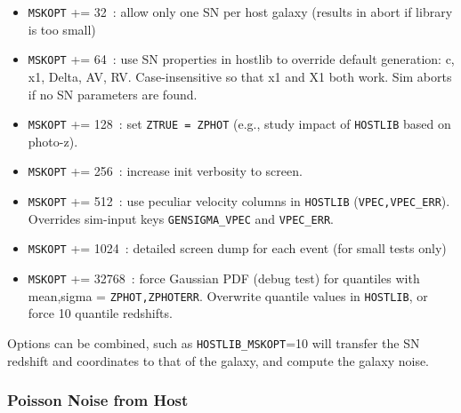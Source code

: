 \documentclass[12pt]{article}
\newcommand{\zhelio}{z_{\rm hel}}
\newcommand{\zcmb}{z_{\rm cmb}}
\newcommand{\vpec}{{\rm v}_{\rm pec}}
\newcommand{\ztrue}{{\tt ZTRUE}}
\begin{document}
{\begin{itemize}
      $\zhelio=$~\ztrue;  $\zcmb$ and $\mu$ are updated
      to account for new $\zhelio$ and generated $\vpec$.
%
\item {\tt MSKOPT} += 32~: allow only one SN per host galaxy 
                         (results in abort if library is too small)
%
\item {\tt MSKOPT} += 64~: 
  use SN properties in hostlib to override default generation:
  c, x1, Delta, AV, RV.
  Case-insensitive so that x1 and X1 both work.
  Sim aborts if no SN parameters are found.
%
\item {\tt MSKOPT} += 128~: set {\tt ZTRUE = ZPHOT} 
     (e.g., study impact of {\tt HOSTLIB} based on photo-z).
%
\item {\tt MSKOPT} += 256~: increase init verbosity to screen.
%
\item {\tt MSKOPT} += 512~: use peculiar velocity columns in {\tt HOSTLIB}
       ({\tt VPEC,VPEC\_ERR}). \\
       Overrides sim-input keys {\tt GENSIGMA\_VPEC} and {\tt VPEC\_ERR}.
%
\item {\tt MSKOPT} += 1024~: detailed screen dump
        for each event (for small tests only)
%
\item {\tt MSKOPT} += 32768~: force Gaussian PDF (debug test) for quantiles with
        mean,sigma = {\tt ZPHOT,ZPHOTERR}. Overwrite quantile values in 
        {\tt HOSTLIB}, or force 10 quantile redshifts.
%
\end{itemize}
%
Options can be combined, such as {\tt HOSTLIB\_MSKOPT}=10
will transfer the SN redshift and coordinates to that of
the galaxy, and compute the galaxy noise.

\subsubsection{Poisson Noise from Host}
\label{sss:host_noise}

\newcommand{\COVHOST}{C_{\rm host}}
\newcommand{\FHOST}{F_{\rm host}}
\newcommand{\redr}{\rho_g}
\newcommand{\Rhalf}{R_{1/2}}

}
\end{document}
